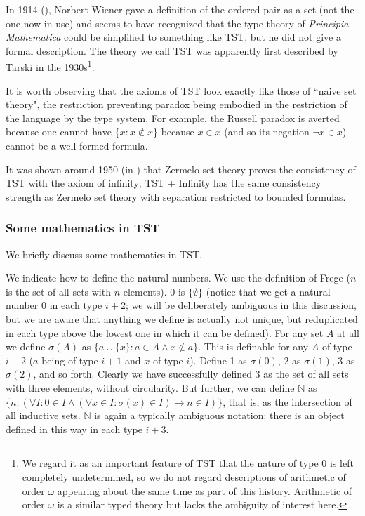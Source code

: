 \documentclass{article}
\theoremstyle{definition}
\theoremstyle{remark}
\begin{document}
In 1914 (\cite{wiener}), Norbert Wiener gave a definition of the ordered pair as a set (not the one now in use) and seems to have recognized that the type theory of {\em Principia Mathematica\/} could be simplified to something like TST, but he did not give a formal description.  The theory we call TST was apparently first described by Tarski in the 1930s\footnote{We regard it as an important feature of TST that the nature of type 0 is left completely undetermined, so we do not regard descriptions of arithmetic of order $\omega$ appearing about the same time as part of this history.     Arithmetic of order $\omega$ is a similar typed theory but lacks the ambiguity of interest here.}.

It is worth observing that the axioms of TST look exactly like those of ``naive set theory", the restriction preventing paradox being embodied in the restriction of the language by the type system.
For example, the Russell paradox is averted because one cannot have $\{x:x \not\in x\}$ because $x \in x$ (and so its negation $\neg x \in x$) cannot be a well-formed formula.

It was shown around 1950 (in \cite{kemeny}) that Zermelo set theory proves the consistency of TST with the axiom of infinity;  TST + Infinity has the same consistency strength as
Zermelo set theory with separation restricted to bounded formulas.




\newpage

\subsubsection{Some mathematics in TST} %

We briefly discuss some mathematics in TST.

We indicate how to define the natural numbers.  We use the definition of Frege ($n$ is the set of all sets with $n$ elements).  0 is $\{\emptyset\}$ (notice that we get a natural number 0 in each type $i+2$;  we will be deliberately ambiguous in this discussion, but we are aware that anything we define is actually not unique, but reduplicated in each type above the lowest one in which it can be defined).  For any set $A$ at all we define $\sigma(A)$ as $\{a \cup \{x\}:a \in A \wedge x \not\in a\}$.  This is definable for any $A$ of type $i+2$ ($a$ being of type $i+1$ and $x$ of type $i$).  Define 1 as $\sigma(0)$, 2 as $\sigma(1)$,  3 as $\sigma(2)$, and so forth.  Clearly we have successfully defined 3 as the set of all sets with three elements, without circularity.
But further, we can define $\mathbb N$ as $\{n:(\forall I:0 \in I \wedge (\forall x \in I:\sigma(x) \in I) \rightarrow n \in I)\}$, that is, as the intersection of all inductive sets.
$\mathbb N$ is again a typically ambiguous notation:  there is an object defined in this way in each type $i+3$.
\end{document}
